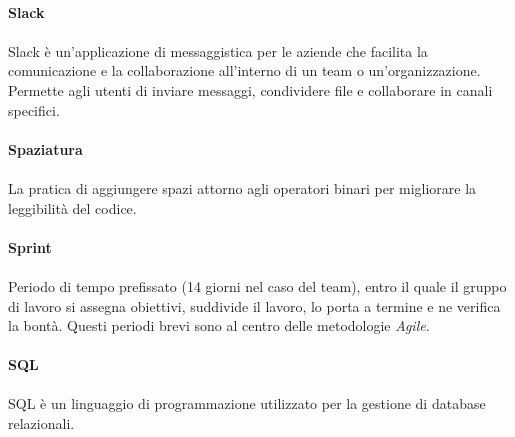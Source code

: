 \documentclass[10pt, a4paper]{article}
\begin{document}
\vspace{2em}
\paragraph{Slack}\noindent\hrulefill
\paragraph{}Slack è un’applicazione di messaggistica per le aziende che facilita la comunicazione e la collaborazione all’interno di un team o un’organizzazione. Permette agli utenti di inviare messaggi, condividere file e collaborare in canali specifici. 

\vspace{2em}
\paragraph{Spaziatura}\noindent\hrulefill
\paragraph{}La pratica di aggiungere spazi attorno agli operatori binari per migliorare la leggibilità del codice.


\vspace{2em}
\paragraph{Sprint}\noindent\hrulefill
\paragraph{}Periodo di tempo prefissato (14 giorni nel caso del team), entro il quale il gruppo di lavoro si assegna obiettivi, suddivide il lavoro, lo porta a termine e ne verifica la bontà. Questi periodi brevi sono al centro delle metodologie \textit{Agile\pg}.

\vspace{2em}
\paragraph{SQL}\noindent\hrulefill
\paragraph{}SQL è un linguaggio di programmazione utilizzato per la gestione di database relazionali.

\vspace{2em}
\end{document}
